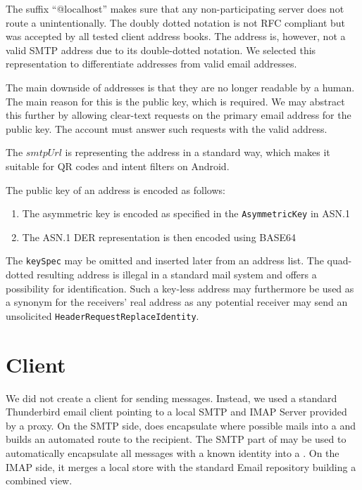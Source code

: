 The suffix ``@localhost'' makes sure that any non-participating server does not route a \VortexMessage{} unintentionally. The doubly dotted notation is not RFC compliant but was accepted by all tested client address books. The address is, however, not a valid SMTP address due to its double-dotted notation. We selected this representation to differentiate \MessageVortex{} addresses from valid email addresses.

The main downside of \MessageVortex{} addresses is that they are no longer readable by a human. The main reason for this is the public key, which is required. We may abstract this further by allowing clear-text requests on the primary email address for the public key. The \MessageVortex{} account must answer such requests with the valid \MessageVortex{} address.

The $smtpUrl$ is representing the address in a standard way, which makes it suitable for QR codes and intent filters on Android.

The public key of an address is encoded as follows:
\begin{enumerate}
	\item The asymmetric key is encoded as specified in the \texttt{AsymmetricKey} in ASN.1
	\item The ASN.1 DER representation is then encoded using BASE64
\end{enumerate}    

The \texttt{keySpec} may be omitted and inserted later from an address list. The quad-dotted resulting address is illegal in a standard mail system and offers a possibility for identification. Such a key-less address may furthermore be used as a synonym for the receivers' real address as any potential receiver may send an unsolicited \texttt{HeaderRequestReplaceIdentity}.

\section{Client}
We did not create a \MessageVortex{} client for sending messages. Instead, we used a standard Thunderbird email client pointing to a local SMTP and IMAP Server provided by a \MessageVortex{} proxy. On the SMTP side, \MessageVortex{} does encapsulate where possible mails into a \VortexMessage{} and builds an automated route to the recipient. The SMTP part of \VortexMessage{} may be used to automatically encapsulate all messages with a known \MessageVortex{} identity into a \VortexMessage. On the IMAP side, it merges a local \VortexMessage{} store with the standard Email repository building a combined view.

